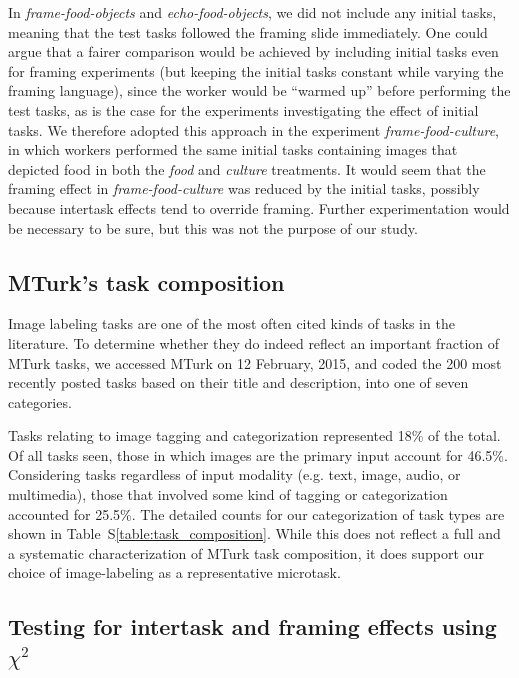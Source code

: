 \documentclass{sigchi}
\begin{document}
In \textit{frame-food-objects} and \textit{echo-food-objects}, we did not
include any initial tasks, meaning that the test tasks followed the framing
slide immediately.  One could argue that a fairer comparison would be achieved
by including initial tasks even for framing experiments (but keeping the
initial tasks constant while varying the framing language), since the worker
would be ``warmed up'' before performing the test tasks, as is the case for
the experiments investigating the effect of initial tasks. 
We therefore adopted this approach in the experiment 
\textit{frame-food-culture}, in which workers performed the same 
initial tasks containing images that depicted food in both the \textit{food}
and \textit{culture} treatments.  It would seem that the framing effect in 
\textit{frame-food-culture} was reduced by the initial tasks, possibly because
intertask effects tend to override framing. Further experimentation 
would be necessary to be sure, but this was not the purpose of our study.

\subsection*{MTurk's task composition}

Image labeling tasks are one of the most often cited kinds of tasks in the
literature.  To determine whether they do indeed reflect an important fraction
of MTurk tasks, we accessed MTurk on 12 February, 2015, and coded the 200 
most recently posted tasks based on their title and description, 
into one of seven categories.

Tasks relating to image tagging and categorization represented 18\% of the 
total.  Of all tasks seen, those in which images are the primary input
account for 46.5\%.  Considering tasks regardless of input modality (e.g.
text, image, audio, or multimedia), those that involved some kind of tagging
or categorization accounted for 25.5\%.  
The detailed counts for our categorization
of task types are shown in Table~S\ref{table:task_composition}.  
While this does not reflect a full and
a systematic characterization of MTurk task composition, it does support our
choice of image-labeling as a representative microtask.

\subsection*{Testing for intertask and framing effects using $\chi^2$}
\end{document}
